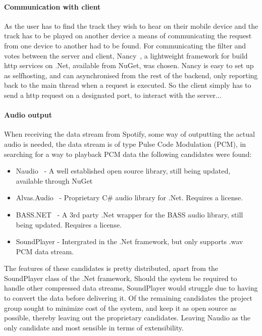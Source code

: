 	\paragraph{Communication with client}
	As the user has to find the track they wish to hear on their mobile device and the track has to be played on another device a means of communicating the request from one device to another had to be found.
	For communicating the filter and votes between the server and client, Nancy~\cite{nancy}, a lightweight framework for build http services on .Net, available from NuGet, was chosen. Nancy is easy to set up as selfhosting, and can asynchronised from the rest of the backend, only reporting back to the main thread when a request is executed. So the client simply has to send a http request on a designated port, to interact with the server...  

	\paragraph{Audio output}
	When receiving the data stream from Spotify, some way of outputting the actual audio is needed, the data stream is of type Pulse Code Modulation (PCM), in searching for a way to playback PCM data the following candidates were found:

\begin{itemize}
	\item Naudio~\cite{naudio} - A well established open source library, still being updated, available through NuGet
	\item Alvas.Audio~\cite{alvas} - Proprietary C\# audio library for .Net. Requires a license.
	\item BASS.NET~\cite{bass} - A 3rd party .Net wrapper for the BASS audio library, still being updated. Requires a license.
	\item SoundPlayer - Intergrated in the .Net framework, but only supports .wav PCM data stream.
\end{itemize}

	The features of these candidates is pretty distributed, apart from the SoundPlayer class of the .Net framework, Should the system be required to handle other compressed data streams, SoundPlayer would struggle due to having to convert the data before delivering it. Of the remaining candidates the project group sought to minimize cost of the system, and keep it as open source as possible, thereby leaving out the proprietary candidates. Leaving Naudio as the only candidate and most sensible in terms of extensibility.